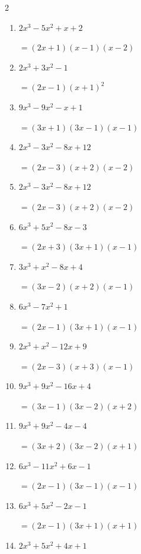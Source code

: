 \begin{multicols}{2}
\begin{enumerate}
  \item $2x^{3}-5x^{2}+x+2$

        $=(2x+1)(x-1)(x-2)$

  \item $2x^{3}+3x^{2}-1$

        $=(2x-1)(x+1) ^{ 2 }$

  \item $9x^{3}-9x^{2}-x+1$

        $=(3x+1)(3x-1)(x-1)$

  \item $2x^{3}-3x^{2}-8x+12$

        $=(2x-3)(x+2)(x-2)$

  \item $2x^{3}-3x^{2}-8x+12$

        $=(2x-3)(x+2)(x-2)$

\columnbreak %

  \item $6x^{3}+5x^{2}-8x-3$

        $=(2x+3)(3x+1)(x-1)$

  \item $3x^{3}+x^{2}-8x+4$

        $=(3x-2)(x+2)(x-1)$

  \item $6x^{3}-7x^{2}+1$

        $=(2x-1)(3x+1)(x-1)$

  \item $2x^{3}+x^{2}-12x+9$

        $=(2x-3)(x+3)(x-1)$

  \item $9x^{3}+9x^{2}-16x+4$

        $=(3x-1)(3x-2)(x+2)$

\columnbreak %

\resetques

  \item $9x^{3}+9x^{2}-4x-4$

        $=(3x+2)(3x-2)(x+1)$

  \item $6x^{3}-11x^{2}+6x-1$

        $=(2x-1)(3x-1)(x-1)$

  \item $6x^{3}+5x^{2}-2x-1$

        $=(2x-1)(3x+1)(x+1)$

  \item $2x^{3}+5x^{2}+4x+1$


\end{enumerate}
\end{multicols}
